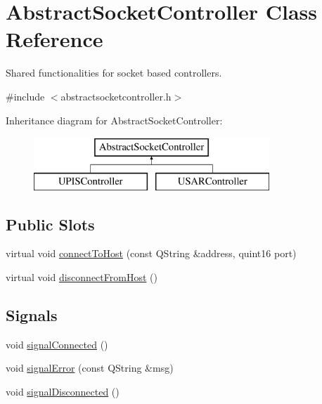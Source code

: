 \hypertarget{classAbstractSocketController}{
\section{AbstractSocketController Class Reference}
\label{classAbstractSocketController}
}


Shared functionalities for socket based controllers.  




{\ttfamily \#include $<$abstractsocketcontroller.h$>$}

Inheritance diagram for AbstractSocketController:\begin{figure}[H]
\begin{center}
\leavevmode
\includegraphics[height=2.000000cm]{classAbstractSocketController}
\end{center}
\end{figure}
\subsection*{Public Slots}
\begin{DoxyCompactItemize}
\item 
virtual void \hyperlink{classAbstractSocketController_a13af2e22144c96860f6a3975365dc1ff}{connectToHost} (const QString \&address, quint16 port)
\item 
virtual void \hyperlink{classAbstractSocketController_a399c565654a03e6cb352dfc576460ff7}{disconnectFromHost} ()
\end{DoxyCompactItemize}
\subsection*{Signals}
\begin{DoxyCompactItemize}
\item 
void \hyperlink{classAbstractSocketController_af09d800cea400d85c29e07322faaf934}{signalConnected} ()
\item 
void \hyperlink{classAbstractSocketController_afc064b05ae1963fc4741d61c49e9b6ad}{signalError} (const QString \&msg)
\item 
void \hyperlink{classAbstractSocketController_a5d1dee9948125660e67a671cabed122f}{signalDisconnected} ()
\end{DoxyCompactItemize}
